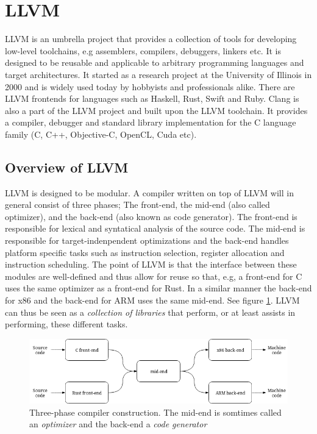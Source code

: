 \section{LLVM}
LLVM is an umbrella project that provides a collection of tools for developing low-level
toolchains, e.g assemblers, compilers, debuggers, linkers etc. It is designed to be reusable and
applicable to arbitrary programming languages and target architectures. It started as a
research project at the University of Illinois in 2000 and is widely used today by hobbyists
and professionals alike. There are LLVM frontends for languages such as Haskell, Rust,
Swift and Ruby. Clang is also a part of the LLVM project and built upon
the LLVM toolchain. It provides a compiler, debugger and standard library implementation
for the C language family (C, C++, Objective-C, OpenCL, Cuda etc).



\subsection{Overview of LLVM}

LLVM is designed to be modular. A compiler written on top of LLVM will in general consist
of three phases; The front-end, the mid-end (also called optimizer), and the back-end
(also known as code generator). The front-end is responsible for lexical and syntatical
analysis of the source code. The mid-end is responsible for target-indenpendent optimizations
and the back-end handles platform specific tasks such as instruction selection, register
allocation and instruction scheduling. The point of LLVM is that the interface between
these modules are well-defined and thus allow for reuse so that, e.g, a front-end for
C uses the same optimizer as a front-end for Rust. In a similar manner the back-end
for x86 and the back-end for ARM uses the same mid-end. See figure \ref{fig:three_phase_compiler}.
LLVM can thus be seen as a \textit{collection of libraries} that perform, or at least
assists in performing, these different tasks.

\begin{figure}[h]
	\centering
	\includegraphics[width=12cm]{background/figures/three_phase_compiler}
	\caption{Three-phase compiler construction. The mid-end is somtimes called an \textit{optimizer}
	and the back-end a \textit{code generator}}
	\label{fig:three_phase_compiler}
\end{figure}

